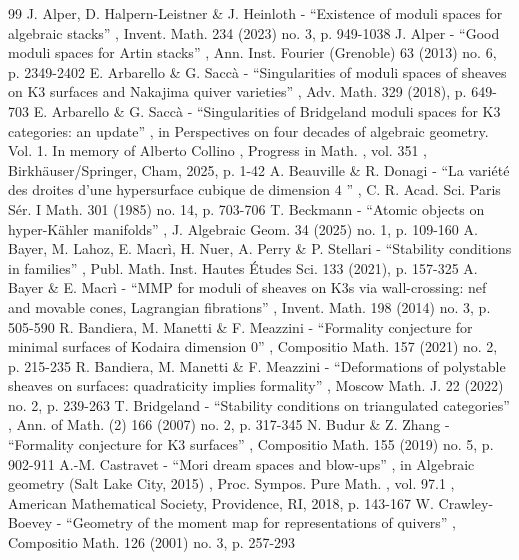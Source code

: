 \documentclass[11pt]{article}
\theoremstyle{definition}
\begin{document}

\begin{thebibliography}{99}
 J. Alper, D. Halpern-Leistner \& J. Heinloth - “Existence of moduli spaces for algebraic stacks” , Invent. Math. 234 (2023) no. 3, p. 949-1038
 J. Alper - “Good moduli spaces for Artin stacks” , Ann. Inst. Fourier (Grenoble) 63 (2013) no. 6, p. 2349-2402
 E. Arbarello \& G. Saccà - “Singularities of moduli spaces of sheaves on K3 surfaces and Nakajima quiver varieties” , Adv. Math. 329 (2018), p. 649-703
 E. Arbarello \& G. Saccà - “Singularities of Bridgeland moduli spaces for K3 categories: an update” , in Perspectives on four decades of algebraic geometry. Vol. 1. In memory of Alberto Collino , Progress in Math. , vol. 351 , Birkhäuser/Springer, Cham, 2025, p. 1-42
 A. Beauville \& R. Donagi - “La variété des droites d’une hypersurface cubique de dimension $4$ ” , C. R. Acad. Sci. Paris Sér. I Math. 301 (1985) no. 14, p. 703-706
 T. Beckmann - “Atomic objects on hyper-Kähler manifolds” , J. Algebraic Geom. 34 (2025) no. 1, p. 109-160
 A. Bayer, M. Lahoz, E. Macrì, H. Nuer, A. Perry \& P. Stellari - “Stability conditions in families” , Publ. Math. Inst. Hautes Études Sci. 133 (2021), p. 157-325
 A. Bayer \& E. Macrì - “MMP for moduli of sheaves on K3s via wall-crossing: nef and movable cones, Lagrangian fibrations” , Invent. Math. 198 (2014) no. 3, p. 505-590
 R. Bandiera, M. Manetti \& F. Meazzini - “Formality conjecture for minimal surfaces of Kodaira dimension 0” , Compositio Math. 157 (2021) no. 2, p. 215-235
 R. Bandiera, M. Manetti \& F. Meazzini - “Deformations of polystable sheaves on surfaces: quadraticity implies formality” , Moscow Math. J. 22 (2022) no. 2, p. 239-263
 T. Bridgeland - “Stability conditions on triangulated categories” , Ann. of Math. (2) 166 (2007) no. 2, p. 317-345
 N. Budur \& Z. Zhang - “Formality conjecture for K3 surfaces” , Compositio Math. 155 (2019) no. 5, p. 902-911
 A.-M. Castravet - “Mori dream spaces and blow-ups” , in Algebraic geometry (Salt Lake City, 2015) , Proc. Sympos. Pure Math. , vol. 97.1 , American Mathematical Society, Providence, RI, 2018, p. 143-167
 W. Crawley-Boevey - “Geometry of the moment map for representations of quivers” , Compositio Math. 126 (2001) no. 3, p. 257-293

\end{thebibliography}
\end{document}
